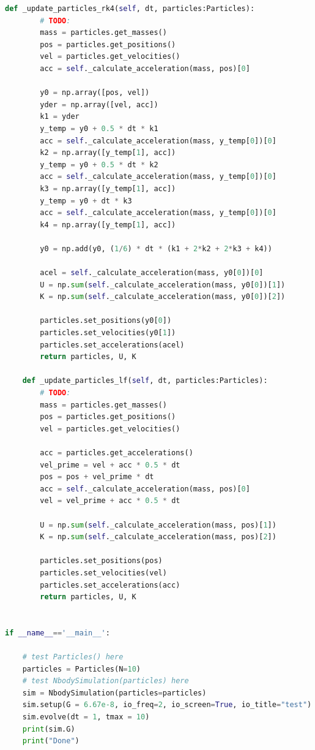 \documentclass[12pt]{article}
\begin{document}
\begin{lstlisting}[language={Python}]
    def _update_particles_rk4(self, dt, particles:Particles):
        # TODO:
        mass = particles.get_masses()
        pos = particles.get_positions()
        vel = particles.get_velocities()
        acc = self._calculate_acceleration(mass, pos)[0]
        
        y0 = np.array([pos, vel])
        yder = np.array([vel, acc])
        k1 = yder
        y_temp = y0 + 0.5 * dt * k1 
        acc = self._calculate_acceleration(mass, y_temp[0])[0]
        k2 = np.array([y_temp[1], acc])
        y_temp = y0 + 0.5 * dt * k2
        acc = self._calculate_acceleration(mass, y_temp[0])[0]
        k3 = np.array([y_temp[1], acc])
        y_temp = y0 + dt * k3
        acc = self._calculate_acceleration(mass, y_temp[0])[0]
        k4 = np.array([y_temp[1], acc])
        
        y0 = np.add(y0, (1/6) * dt * (k1 + 2*k2 + 2*k3 + k4))
        
        acel = self._calculate_acceleration(mass, y0[0])[0]
        U = np.sum(self._calculate_acceleration(mass, y0[0])[1])
        K = np.sum(self._calculate_acceleration(mass, y0[0])[2])
        
        particles.set_positions(y0[0])
        particles.set_velocities(y0[1])
        particles.set_accelerations(acel)
        return particles, U, K
    
    def _update_particles_lf(self, dt, particles:Particles):
        # TODO:
        mass = particles.get_masses()
        pos = particles.get_positions()
        vel = particles.get_velocities()
        
        acc = particles.get_accelerations()
        vel_prime = vel + acc * 0.5 * dt
        pos = pos + vel_prime * dt
        acc = self._calculate_acceleration(mass, pos)[0]
        vel = vel_prime + acc * 0.5 * dt
        
        U = np.sum(self._calculate_acceleration(mass, pos)[1])
        K = np.sum(self._calculate_acceleration(mass, pos)[2])
        
        particles.set_positions(pos)
        particles.set_velocities(vel)
        particles.set_accelerations(acc)
        return particles, U, K


if __name__=='__main__':

    # test Particles() here
    particles = Particles(N=10)
    # test NbodySimulation(particles) here
    sim = NbodySimulation(particles=particles)
    sim.setup(G = 6.67e-8, io_freq=2, io_screen=True, io_title="test")
    sim.evolve(dt = 1, tmax = 10)
    print(sim.G)
    print("Done")
      \end{lstlisting}
\end{document}
